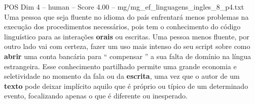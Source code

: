 \begin{textsample}{POS Dim 4 – human – Score 4.00 – mg/mg\_ef\_linguagens\_ingles\_8\_p4.txt}  \label{ex:f4_pos_018}
Uma pessoa que seja fluente no idioma do país enfrentará menos problemas na execução dos procedimentos necessários, pois tem o conhecimento do código linguístico para as interações \textbf{orais} ou escritas.
Uma pessoa menos fluente, por outro lado vai com certeza, fazer um uso mais intenso do seu script sobre como \textbf{abrir} uma conta bancária para “ compensar ” a sua falta de domínio na língua estrangeira.
Esse conhecimento partilhado permite uma grande economia e seletividade no momento da fala ou da \textbf{escrita}, uma vez que o autor de um \textbf{texto} pode deixar implícito aquilo que é próprio ou típico de um determinado evento, focalizando apenas o que é diferente ou inesperado.

\end{textsample}
